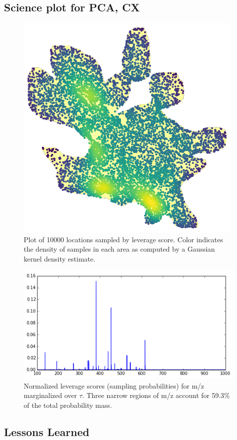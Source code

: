  \subsection{Science plot for PCA, CX}
    \begin{figure} [H]
    \begin{centering}
    \includegraphics[width=\linewidth]{images/cx_spatial.png}
    \end{centering}
    \caption{Plot of 10000 locations sampled by leverage score.
      Color indicates the density of samples in each area as computed by a Gaussian kernel density estimate.}
    \label{fig:cx_spatial}
    \end{figure} 

    \begin{figure} [H]
    \begin{centering}
    \includegraphics[width=\linewidth]{images/cx_ions.png}
    \end{centering}
    \caption{Normalized leverage scores (sampling probabilities) for m/z marginalized over $\tau$.
      Three narrow regions of m/z account for 59.3\% of the total probability mass.}
    \label{fig:cx_ions}
    \end{figure} 


  \subsection{Lessons Learned}
  \label{sect:lessons}
  
  

